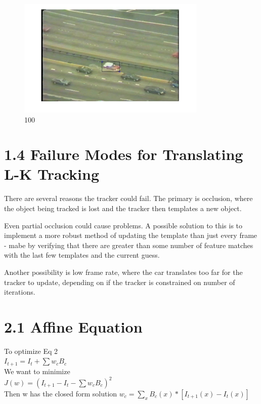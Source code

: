 \documentclass[11pt]{article}
\begin{document}
\begin{figure}[H]
\centering
\includegraphics[width=90mm]{carFrame100.jpg}
\caption{ 100 }
\end{figure}


\section*{1.4 Failure Modes for Translating L-K Tracking}
There are several reasons the tracker could fail. The primary is occlusion, where the object being tracked is lost and the tracker then templates a new object. 

Even partial occlusion could cause problems. A possible solution to this is to implement a more robust method of updating the template than just every frame - mabe by verifying that there are greater than some number of feature matches with the last few templates and the current guess. 

Another possibility is low frame rate, where the car translates too far for the tracker to update, depending on if the tracker is constrained on number of iterations. 



\section*{2.1 Affine Equation}
To optimize Eq 2 \\
$I_{t+1} = I_t + \sum{w_cB_c}$
\\
We want to minimize \\
$J(w) = (I_{t+1} - I_t - \sum{w_cB_c})^2$
\\
Then w has the closed form solution
$w_c = \sum_x{B_c(x)*[I_{t+1}(x) - I_t(x)]}$

\end{document}
